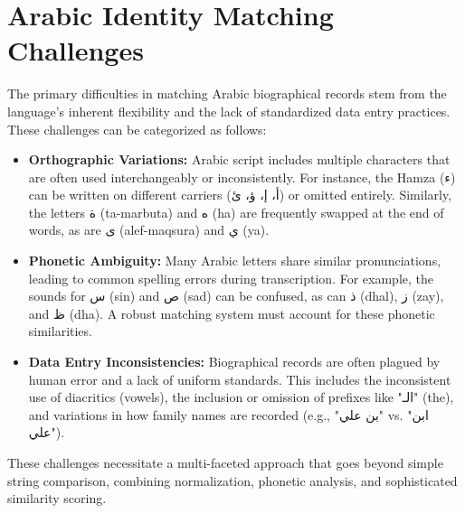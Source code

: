 \section{Arabic Identity Matching Challenges}
The primary difficulties in matching Arabic biographical records stem from the language's inherent flexibility and the lack of standardized data entry practices. These challenges can be categorized as follows:
\begin{itemize}
    \item \textbf{Orthographic Variations:} Arabic script includes multiple characters that are often used interchangeably or inconsistently. For instance, the Hamza (ء) can be written on different carriers (\textarabic{أ، إ، ؤ، ئ}) or omitted entirely. Similarly, the letters \textarabic{ة} (ta-marbuta) and \textarabic{ه} (ha) are frequently swapped at the end of words, as are \textarabic{ى} (alef-maqsura) and \textarabic{ي} (ya).
    \item \textbf{Phonetic Ambiguity:} Many Arabic letters share similar pronunciations, leading to common spelling errors during transcription. For example, the sounds for \textarabic{س} (sin) and \textarabic{ص} (sad) can be confused, as can \textarabic{ذ} (dhal), \textarabic{ز} (zay), and \textarabic{ظ} (dha). A robust matching system must account for these phonetic similarities.
    \item \textbf{Data Entry Inconsistencies:} Biographical records are often plagued by human error and a lack of uniform standards. This includes the inconsistent use of diacritics (vowels), the inclusion or omission of prefixes like "\textarabic{الـ}" (the), and variations in how family names are recorded (e.g., "\textarabic{بن علي}" vs. "\textarabic{ابن علي}").
\end{itemize}
These challenges necessitate a multi-faceted approach that goes beyond simple string comparison, combining normalization, phonetic analysis, and sophisticated similarity scoring.

